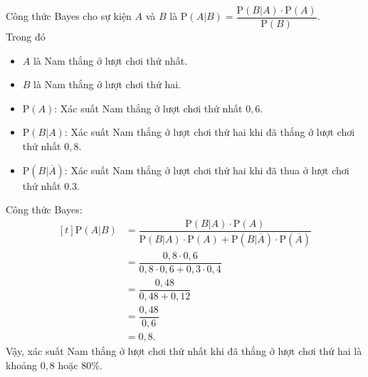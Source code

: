 \begin{bt}
{\begin{listEX}
\begin{center}
\begin{tikzpicture}[scale=.2,>=stealth]
				\end{tikzpicture}
			\end{center}
			\item
			Công thức Bayes cho sự kiện $A$ và $B$ là $\mathrm{P}(A | B)=\dfrac{\mathrm{P}(B | A) \cdot \mathrm{P}(A)}{\mathrm{P}(B)}	$.\\
			Trong đó
			\begin{itemize}
				\item $A$ là Nam thắng ở lượt chơi thứ nhất.
				\item $B$ là Nam thắng ở lượt chơi thứ hai.
				\item $\mathrm{P}(A)$: Xác suất Nam thắng ở lượt chơi thứ nhất $0{,}6$.
				\item $\mathrm{P}(B | A)$: Xác suất Nam thắng ở lượt chơi thứ hai khi đã thắng ở lượt chơi thứ nhất $0{,}8$.
				\item $\mathrm{P}(B | \overline{A})$: Xác suất Nam thắng ở lượt chơi thứ hai khi đã thua ở lượt chơi thứ nhất $0.3$.
			\end{itemize}
			Công thức Bayes:
			$$
			\begin{aligned}[t]
				\mathrm{P}(A | B)&=\dfrac{\mathrm{P}(B | A) \cdot \mathrm{P}(A)}{\mathrm{P}(B | A) \cdot \mathrm{P}(A)+\mathrm{P}(B | \overline{A}) \cdot \mathrm{P}(\overline{A})} \\
				& =\dfrac{0{,}8 \cdot 0{,}6}{0{,}8 \cdot 0{,}6+0{,}3 \cdot 0{,}4} \\
				& = \dfrac{0{,}48}{0{,}48+0{,}12} \\
				& = \dfrac{0{,}48}{0{,}6} \\
				& = 0{,}8.
			\end{aligned}
			$$
			Vậy, xác suất Nam thắng ở lượt chơi thứ nhất khi đã thắng ở lượt chơi thứ hai là khoảng $0{,}8$ hoặc $80 \%$.
		\end{listEX}
	}
\end{bt}

